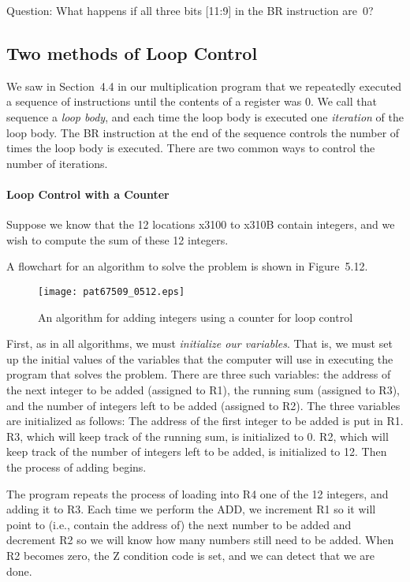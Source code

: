 \documentclass{patt}
\begin{document}
\questionmark[-16pt]

Question: What happens if all three bits [11:9] in the BR instruction are~0?

\subsection{Two methods of Loop Control}

We saw in Section~4.4 in our multiplication program that we repeatedly 
executed a sequence of
instructions until the contents of a register was 0.  We call that sequence
a {\em loop body}, and each time the loop body is executed one {\em iteration}
of the loop body.  The BR instruction at the end of the sequence controls the
number of times the loop body is executed.  There are two common 
ways to control the number of iterations.  

\paragraph{Loop Control with a Counter}
  
\FloatBarrier
Suppose we know that the 12 locations x3100 to x310B contain
integers, and we wish to compute the sum of these 12 integers.

A flowchart for an algorithm to solve the problem is shown in
Figure~5.12.

\begin{figure}
\centerline{\texttt{[image: pat67509\_0512.eps]}}
\caption{An algorithm for adding integers using a counter for loop control}
\label{fig:12adds}
\end{figure}

First, as in all algorithms, we must {\em initialize our variables}.
That is,
we must set up the initial values of the variables that the computer
will use in executing the program that solves the problem. There
are three such variables: the address of the next integer to be
added (assigned to R1), the running sum (assigned to R3), and
the number of integers left to be added (assigned to R2). The
three variables are initialized as follows: The address of the
first integer to be added is put in R1. R3, which will keep
track of the running sum, is initialized to 0. R2, which will
keep track of the number of integers left to be added, is initialized
to 12. Then the process of adding begins.

The program repeats the process of loading into R4 one of the 12
integers, and adding it to R3. Each time we perform the ADD, we
increment R1 so it will point to (i.e., contain the address of)
the next number to be added and decrement R2 so we will know how
many numbers still need to be added. When R2 becomes zero, the Z
condition code is set, and we can detect that we are done.
\end{document}
